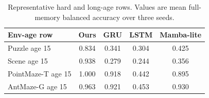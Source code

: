 \begin{table}[H]
\centering
\footnotesize
\caption{Representative hard and long-age rows.  Values are mean full-memory balanced accuracy over three seeds.}
\label{tab:hard-rows}
\begin{tabular}{lcccc}
\toprule
Env-age row & Ours & GRU & LSTM & Mamba-lite\\
\midrule
Puzzle age 15 & 0.834 & 0.341 & 0.304 & 0.425\\
Scene age 15 & 0.938 & 0.279 & 0.244 & 0.356\\
PointMaze-T age 15 & 1.000 & 0.918 & 0.442 & 0.895\\
AntMaze-G age 15 & 0.963 & 0.921 & 0.453 & 0.930\\
\bottomrule
\end{tabular}
\end{table}
